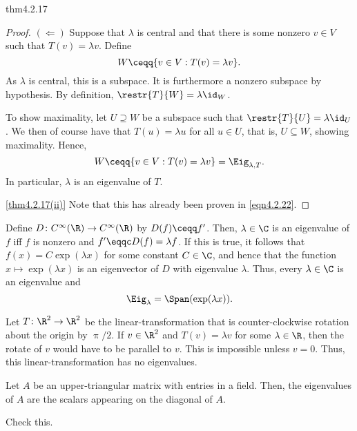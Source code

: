 \begin{thm}{}{thm4.2.17}
\begin{proof}
		\blni
		$(\Leftarrow )$ Suppose that $\lambda$ is central and that there is some nonzero $v\in V$ such that $T(v)=\lambda v$.  Define
		\begin{equation}
			W\ceqq \{ v\in V:T(v)=\lambda v\} .
		\end{equation}
		As $\lambda$ is central, this is a subspace.  It is furthermore a nonzero subspace by hypothesis.  By definition, $\restr{T}{W}=\lambda \id _W$.
		
		To show maximality, let $U\supseteq W$ be a subspace such that $\restr{T}{U}=\lambda \id _U$.  We then of course have that $T(u)=\lambda u$ for all $u\in U$, that is, $U\subseteq W$, showing maximality.  Hence,
		\begin{equation}\label{eqn4.2.22}
			W\ceqq \{ v\in V:T(v)=\lambda v\} =\Eig _{\lambda ,T}.
		\end{equation}
		In particular, $\lambda$ is an eigenvalue of $T$.
		
		\blni
		\cref{thm4.2.17(ii)} Note that this has already been proven in \eqref{eqn4.2.22}.
	\end{proof}
\end{thm}

\begin{exm}{}{}
	Define $D\colon C^{\infty}(\R )\rightarrow C^{\infty}(\R )$ by $D(f)\ceqq f'$.  Then, $\lambda \in \C$ is an eigenvalue of $f$ iff $f$ is nonzero and $f'\eqqc D(f)=\lambda f$.  If this is true, it follows that $f(x)=C\exp (\lambda x)$ for some constant $C\in \C$, and hence that the function $x\mapsto \exp (\lambda x)$ is an eigenvector of $D$ with eigenvalue $\lambda$.  Thus, every $\lambda \in \C$ is an eigenvalue and
	\begin{equation}
		\Eig _{\lambda}=\Span (\exp (\lambda x)).
	\end{equation}
\end{exm}
\begin{exm}{}{}
	Let $T\colon \R ^2\rightarrow \R ^2$ be the linear-transformation that is counter-clockwise rotation about the origin by $\uppi /2$.  If $v\in \R ^2$ and $T(v)=\lambda v$ for some $\lambda \in \R$, then the rotate of $v$ would have to be parallel to $v$.  This is impossible unless $v=0$.  Thus, this linear-transformation has no eigenvalues.
\end{exm}
\begin{exm}{}{}
	Let $A$ be an upper-triangular matrix with entries in a field.  Then, the eigenvalues of $A$ are the scalars appearing on the diagonal of $A$.
	\begin{exr}[breakable=false]{}{}
		Check this.
	\end{exr}
\end{exm}

